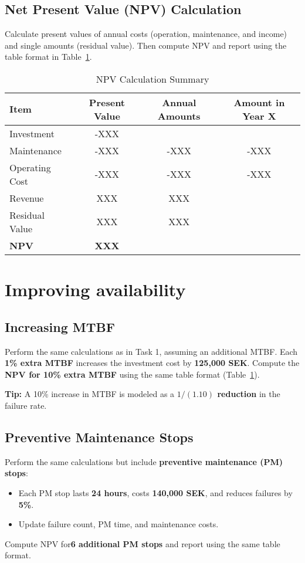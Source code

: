 \documentclass[a4paper,12pt]{exam}
\begin{document}
\subsection{Net Present Value (NPV) Calculation}
Calculate present values of annual costs (operation, maintenance, and income) and single amounts (residual value). Then compute NPV and report using the table format in Table~\ref{NPVtable}.

\begin{table}[h]
    \centering
    \begin{tabular}{lccc}
        \toprule
        \textbf{Item} & \textbf{Present Value} & \textbf{Annual Amounts} & \textbf{Amount in Year X} \\
        \midrule
        Investment & -XXX &  &  \\
        Maintenance & -XXX & -XXX & -XXX \\
        Operating Cost & -XXX & -XXX & -XXX \\
        Revenue & XXX & XXX &  \\
        Residual Value & XXX & XXX &  \\
        \textbf{NPV} & \textbf{XXX} &  &  \\
        \bottomrule
    \end{tabular}
    \caption{NPV Calculation Summary}
    \label{NPVtable}
\end{table}

\section{Improving availability}
\subsection{Increasing MTBF}
Perform the same calculations as in Task 1, assuming an additional MTBF. Each \textbf{1\% extra MTBF} increases the investment cost by \textbf{125,000 SEK}. Compute the \textbf{NPV for 10\% extra MTBF} using the same table format (Table~\ref{NPVtable}).

\textbf{Tip:} A 10\% increase in MTBF is modeled as a \textbf{$1/(1.10)$ reduction} in the failure rate.

\subsection{Preventive Maintenance Stops}
Perform the same calculations but include \textbf{preventive maintenance (PM) stops}:
\begin{itemize}
    \item Each PM stop lasts \textbf{24 hours}, costs \textbf{140,000 SEK}, and reduces failures by \textbf{5\%}.
    \item Update failure count, PM time, and maintenance costs.
\end{itemize}
Compute NPV for\textbf{6 additional PM stops} and report using the same table format.
\end{document}
